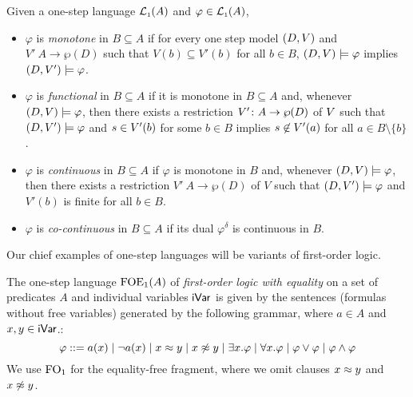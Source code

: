 \begin{definition}\label{def:semnotions} Given a one-step language $\mathcal{L}_{\scriptscriptstyle 1}(A)$ and $\varphi \in \mathcal{L}_{\scriptscriptstyle 1}(A)$,
\begin{itemize}
\item $\varphi$ is \emph{monotone} in $B \subseteq A$ if for every one step model $(D,V)$ and $V' \: A \to \wp(D)$ such that $V(b) \subseteq V'(b)$ for all $b \in B$, $(D,V) \models \varphi$ implies $(D,V') \models \varphi$.
\item $\varphi$ is \emph{functional} in $B\subseteq A$ if it is monotone in $B \subseteq A$ and, whenever $(D,V) \models \varphi$, then there exists a restriction $V' \colon A \to \wp(D)$ of $V$ such that $(D,V') \models \varphi$ and $s \in V'(b)$ for some $b \in B$ implies $s \not\in V'(a)$ for all $a \in B\setminus\{b\}$.
\item $\varphi$ is \emph{continuous} in $B \subseteq A$ if $\varphi$ is monotone in $B$ and, whenever $(D,V) \models \varphi$, then there exists a restriction $V' \: A \to \wp(D)$ of $V$ such that $(D,V') \models \varphi$ and $V'(b)$ is finite for all $b \in B$.
\item $\varphi$ is \emph{co-continuous} in $B \subseteq A$ if its dual $\varphi^{\delta}$ is continuous in $B$.
\end{itemize}
\end{definition}

Our chief examples of one-step languages will be variants of first-order logic.

\begin{definition}
The one-step language $\mathrm{FOE}_1(A)$ of \emph{first-order logic with equality} on a set of predicates $A$ and individual variables $\mathsf{iVar}$ is given by the sentences (formulas without free variables) generated by the following grammar, where $a \in A$ and $x,y\in\mathsf{iVar}$.:
\begin{equation}\label{eq:grammarofoe}
\varphi ::= a(x) \mid \lnot a(x) \mid x \foeq y \mid x \not\foeq y \mid \exists x.\varphi \mid \forall x.\varphi \mid \varphi \lor \varphi \mid \varphi \land \varphi
\end{equation}
We use $\mathrm{FO}_1$ for the equality-free fragment, where we omit clauses $x \approx y$ and $x \not\approx y$.
\end{definition}

